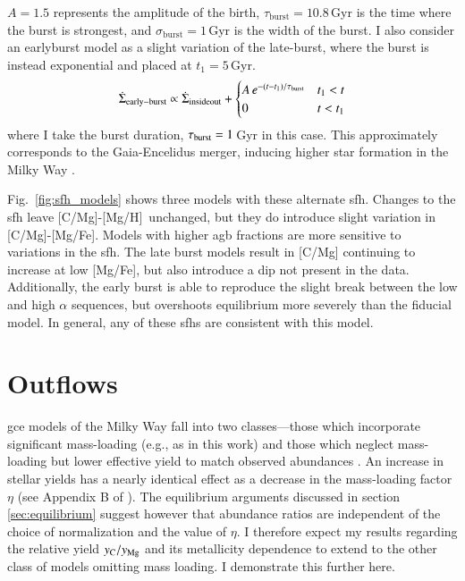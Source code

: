 \documentclass[12pt,oneside,letterpaper]{report}
\newcommand{\agb}{\gls{agb}}
\newcommand{\sfh}{\gls{sfh}}
\newcommand{\gce}{\gls{gce}}
\newcommand{\caah}{[C/Mg]-[Mg/H]}
\newcommand{\caafe}{[C/Mg]-[Mg/Fe]}
\begin{document}
$A=1.5$ represents the amplitude of the birth, $\tau_\text{burst}=10.8$\,Gyr is the time where the burst is strongest, and $\sigma_\text{burst}=1$\,Gyr is the width of the burst.
I also consider an earlyburst model as a slight variation of the late-burst, where the burst is instead exponential and placed at $t_1=5$\,Gyr. 
\begin{equation}\label{eq:twoinfall}
    \dot{\Sigma}_{\rm early-burst} \propto \dot{\Sigma}_{\rm insideout} + 
\begin{cases}
    A\,e^{-(t-t_1)/\tau_{\rm burst}} & t_1 < t \\
      0 & t<t_1
\end{cases}
\end{equation}
where I take the burst duration, $\tau_{\rm burst}=1$\,Gyr in this case. 
This approximately corresponds to the Gaia-Encelidus merger, inducing higher star formation in the Milky Way \citep{spitoni21, bonaca20, helmi18}.

Fig.~\ref{fig:sfh_models} shows three models with these alternate \sfh{}. Changes to the \sfh{} leave \caah\ unchanged, but they do introduce slight variation in \caafe. Models with higher \agb{} fractions are more sensitive to variations in the \sfh{}. The late burst models result in [C/Mg] continuing to increase at low [Mg/Fe], but also introduce a dip not present in the data. Additionally, the early burst
is able to reproduce the slight break between the low and high $\alpha$ sequences, but overshoots equilibrium more severely than the fiducial model. 
In general, any of these \sfh{}s are consistent with this model.

\section{Outflows} \label{sec:outflows}

\gce{} models of the Milky Way fall into two classes---those which incorporate significant mass-loading (e.g., as in this work) and those which neglect mass-loading but lower effective yield to match observed abundances \citep[e.g.][]{MCM13, MCM14, spitoni19, spitoni20, spitoni21}.
An increase in stellar yields has a nearly identical effect as a decrease in the mass-loading factor $\eta$ (see Appendix B of \citealt{james_dwarf}).
The equilibrium arguments discussed in section \ref{sec:equilibrium} suggest however that abundance ratios are independent of the choice of normalization and the value of $\eta$. I therefore expect my results regarding the relative yield $y_{\rm C}/y_{\rm Mg}$ and its metallicity dependence to extend to the other class of models omitting mass loading. I demonstrate this further here.
\end{document}
